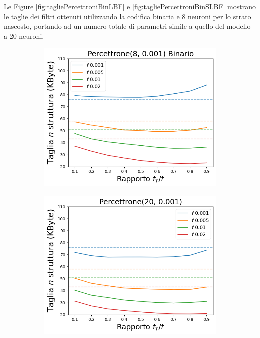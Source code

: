 \documentclass[../../main.tex]{subfiles}
\begin{document}
    Le Figure \ref{fig:tagliePercettroniBinLBF} e \ref{fig:tagliePercettroniBinSLBF} mostrano le taglie dei filtri ottenuti utilizzando la codifica binaria e 8 neuroni per lo strato nascosto, portando ad un numero totale di parametri simile a quello del modello a 20 neuroni.

    \begin{figure}[H]
        \centering
        \begin{subfigure}[b]{0.48\textwidth}
            \centering
            \includegraphics[width=\textwidth]{immagini/7/LBF/Percettrone(8, 0.001) Binario_Taglia.png}
            \caption{}
        \end{subfigure}
        \begin{subfigure}[b]{0.48\textwidth}
            \centering
            \includegraphics[width=\textwidth]{immagini/7/LBF/Percettrone(20, 0.001)_Taglia.png}

\end{subfigure}
\end{figure}
\end{document}
